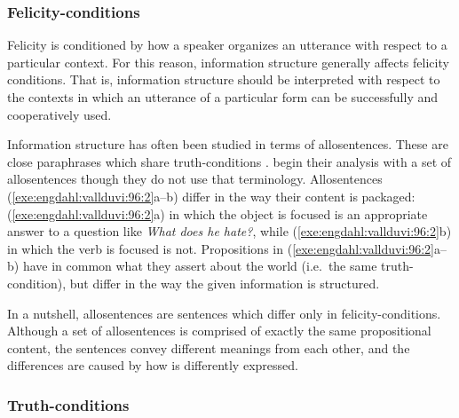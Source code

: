 \subsubsection{Felicity-conditions}
\label{3:sssec:truth-condition:felicity-condition}



Felicity is conditioned by how a speaker organizes an utterance with
respect to a particular context. For this reason,
information structure generally affects felicity
conditions. That is, information structure
should be interpreted with respect to the contexts in which an
utterance of a particular form can be successfully and cooperatively
used.


Information structure has often been studied in terms of
allosentences. These are close paraphrases which share
truth-conditions \citep{lambrecht:96}.  \citet{engdahl:vallduvi:96}
begin their analysis with a set of allosentences though they do not
use that terminology. Allosentences
(\ref{exe:engdahl:vallduvi:96:2}a--b) differ in the way their content
is packaged: (\ref{exe:engdahl:vallduvi:96:2}a) in which the object is
focused is an appropriate answer to a question like \textit{What does
  he hate?}, while (\ref{exe:engdahl:vallduvi:96:2}b) in which the
verb is focused is not. Propositions in
(\ref{exe:engdahl:vallduvi:96:2}a--b) have in common what they assert
about the world (i.e.\ the same truth-condition), but differ in the
way the given information is structured.


\noindent In a nutshell, allosentences are sentences which differ only
in felicity-conditions. Although a set of allosentences is comprised
of exactly the same propositional content, the sentences convey
different meanings from each other, and the differences are caused by
how  is differently expressed.




\subsubsection{Truth-conditions}
\label{3:sssec:focus-sensitivity}

